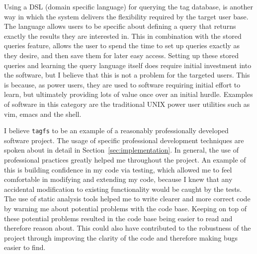 Using a DSL (domain specific language) for querying the tag database, is
another way in which the system delivers the flexibility required by the target
user base. The language allows users to be specific about defining a query that
returns exactly the results they are interested in. This in combination with
the stored queries feature, allows the user to spend the time to set up queries
exactly as they desire, and then save them for later easy access. Setting up
these stored queries and learning the query language itself does require
initial investment into the software, but I believe that this is not a problem
for the targeted users. This is because, as power users, they are used to
software requiring initial effort to learn, but ultimately providing lots of
value once over an initial hurdle. Examples of software in this category are
the traditional UNIX power user utilities such as vim, emacs and the shell.

I believe \texttt{tagfs} to be an example of a reasonably professionally
developed software project. The usage of specific professional development
techniques are spoken about in detail in Section~\ref{sec:implementation}. In
general, the use of professional practices greatly helped me throughout the
project. An example of this is building confidence in my code via testing,
which allowed me to feel comfortable in modifying and extending my code,
because I knew that any accidental modification to existing functionality would
be caught by the tests. The use of static analysis tools helped me to write
clearer and more correct code by warning me about potential problems with the
code base. Keeping on top of these potential problems resulted in the code base
being easier to read and therefore reason about. This could also have
contributed to the robustness of the project through improving the clarity of
the code and therefore making bugs easier to find.

